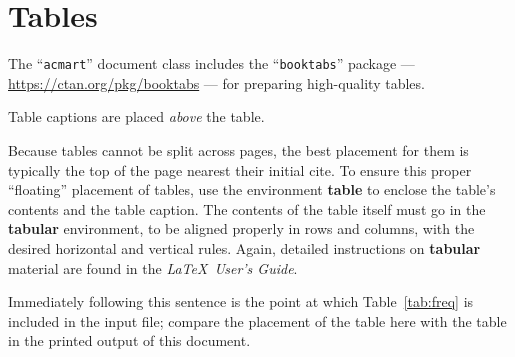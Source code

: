 \documentclass[sigchi]{acmart}
\begin{document}
%
%
%


\section{Tables}

The ``\verb|acmart|'' document class includes the ``\verb|booktabs|''
package --- \url{https://ctan.org/pkg/booktabs} --- for preparing
high-quality tables.

Table captions are placed {\itshape above} the table.

Because tables cannot be split across pages, the best placement for
them is typically the top of the page nearest their initial cite.  To
ensure this proper ``floating'' placement of tables, use the
environment \textbf{table} to enclose the table's contents and the
table caption.  The contents of the table itself must go in the
\textbf{tabular} environment, to be aligned properly in rows and
columns, with the desired horizontal and vertical rules.  Again,
detailed instructions on \textbf{tabular} material are found in the
\textit{\LaTeX\ User's Guide}.

Immediately following this sentence is the point at which
Table~\ref{tab:freq} is included in the input file; compare the
placement of the table here with the table in the printed output of
this document.
\end{document}
